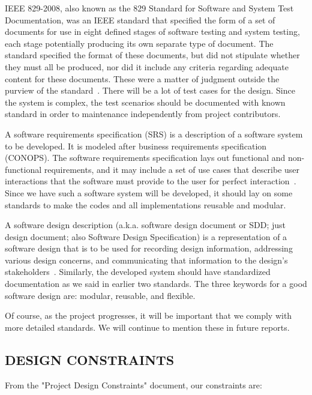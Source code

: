 \documentclass[12pt]{article}
\begin{document}
    IEEE 829-2008, also known as the 829 Standard for Software and System Test Documentation, was an IEEE standard that specified the form of a set of documents for use in eight defined stages of software testing and system testing, each stage potentially producing its own separate type of document. The standard specified the format of these documents, but did not stipulate whether they must all be produced, nor did it include any criteria regarding adequate content for these documents. These were a matter of judgment outside the purview of the standard~\cite{enwiki:1105776890}. There will be a lot of test cases for the design. Since the system is complex, the test scenarios should be documented with known standard in order to maintenance independently from project contributors.

    A software requirements specification (SRS) is a description of a software system to be developed. It is modeled after business requirements specification (CONOPS). The software requirements specification lays out functional and non-functional requirements, and it may include a set of use cases that describe user interactions that the software must provide to the user for perfect interaction~\cite{enwiki:1117244157}. Since we have such a software system will be developed, it should lay on some standards to make the codes and all implementations reusable and modular.

    A software design description (a.k.a. software design document or SDD; just design document; also Software Design Specification) is a representation of a software design that is to be used for recording design information, addressing various design concerns, and communicating that information to the design’s stakeholders~\cite{enwiki:1105986397}. Similarly, the developed system should have standardized documentation as we said in earlier two standards. The three keywords for a good software design are: modular, reusable, and flexible.

    Of course, as the project progresses, it will be important that we comply with more detailed standards. We will continue to mention these in future reports.


    \subsection{DESIGN CONSTRAINTS}

    From the "Project Design Constraints" document, our constraints are:
\end{document}

